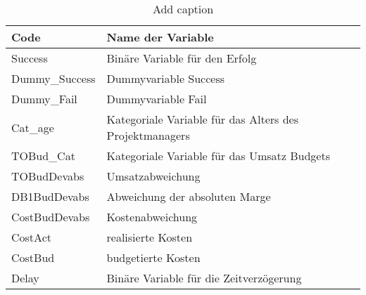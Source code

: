 \begin{table}[htbp]
	\centering
	\caption{Add caption}
	\begin{tabular}{ll}
		\toprule
		\textbf{Code} & \textbf{Name der Variable} \\
		\midrule
		Success & Binäre Variable für den Erfolg \\
		Dummy\_Success & Dummyvariable Success \\
		Dummy\_Fail & Dummyvariable Fail \\
		Cat\_age & Kategoriale Variable für das Alters des Projektmanagers \\
		TOBud\_Cat & Kategoriale Variable für das Umsatz Budgets \\
		TOBudDevabs & Umsatzabweichung \\
		DB1BudDevabs & Abweichung der absoluten Marge \\
		CostBudDevabs & Kostenabweichung \\
		CostAct & realisierte Kosten \\
		CostBud & budgetierte Kosten \\
		Delay & Binäre Variable für die Zeitverzögerung \\
		\bottomrule
	\end{tabular}%
	\label{tab:zusvar}%
\end{table}%



